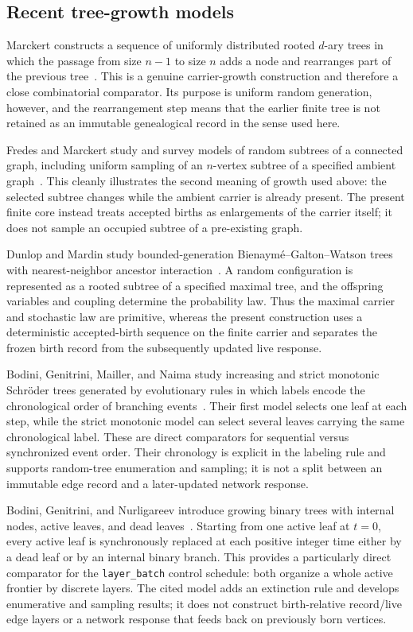 \documentclass[11pt]{article}
\theoremstyle{remark}
\newcommand{\code}[1]{\texttt{#1}}
\numberwithin{equation}{section}
\begin{document}
\subsection{Recent tree-growth models}
Marckert constructs a sequence of uniformly distributed rooted $d$-ary trees in which the passage from size $n-1$ to size $n$ adds a node and rearranges part of the previous tree~\cite{Marckert2023}. This is a genuine carrier-growth construction and therefore a close combinatorial comparator. Its purpose is uniform random generation, however, and the rearrangement step means that the earlier finite tree is not retained as an immutable genealogical record in the sense used here.

Fredes and Marckert study and survey models of random subtrees of a connected graph, including uniform sampling of an $n$-vertex subtree of a specified ambient graph~\cite{FredesMarckert2023}. This cleanly illustrates the second meaning of growth used above: the selected subtree changes while the ambient carrier is already present. The present finite core instead treats accepted births as enlargements of the carrier itself; it does not sample an occupied subtree of a pre-existing graph.

Dunlop and Mardin study bounded-generation Bienaym\'e--Galton--Watson trees with nearest-neighbor ancestor interaction~\cite{DunlopMardin2022}. A random configuration is represented as a rooted subtree of a specified maximal tree, and the offspring variables and coupling determine the probability law. Thus the maximal carrier and stochastic law are primitive, whereas the present construction uses a deterministic accepted-birth sequence on the finite carrier and separates the frozen birth record from the subsequently updated live response.

Bodini, Genitrini, Mailler, and Naima study increasing and strict monotonic Schr\"oder trees generated by evolutionary rules in which labels encode the chronological order of branching events~\cite{BodiniGenitriniMaillerNaima2022}. Their first model selects one leaf at each step, while the strict monotonic model can select several leaves carrying the same chronological label. These are direct comparators for sequential versus synchronized event order. Their chronology is explicit in the labeling rule and supports random-tree enumeration and sampling; it is not a split between an immutable edge record and a later-updated network response.

Bodini, Genitrini, and Nurligareev introduce growing binary trees with internal nodes, active leaves, and dead leaves~\cite{BodiniGenitriniNurligareev2026}. Starting from one active leaf at $t=0$, every active leaf is synchronously replaced at each positive integer time either by a dead leaf or by an internal binary branch. This provides a particularly direct comparator for the \code{layer\_batch} control schedule: both organize a whole active frontier by discrete layers. The cited model adds an extinction rule and develops enumerative and sampling results; it does not construct birth-relative record/live edge layers or a network response that feeds back on previously born vertices.
\end{document}
